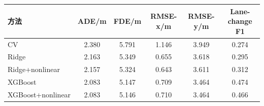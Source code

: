\begin{tabular}{lccccc}
\toprule
方法 & ADE/m & FDE/m & RMSE-x/m & RMSE-y/m & Lane-change F1 \\ 
\midrule
CV & 2.380 & 5.791 & 1.146 & 3.949 & 0.274 \\ 
Ridge & 2.163 & 5.349 & 0.655 & 3.618 & 0.295 \\ 
Ridge+nonlinear & 2.157 & 5.324 & 0.643 & 3.611 & 0.312 \\ 
XGBoost & 2.083 & 5.147 & 0.709 & 3.464 & 0.474 \\ 
XGBoost+nonlinear & 2.083 & 5.146 & 0.710 & 3.464 & 0.466 \\ 
\bottomrule
\end{tabular}
